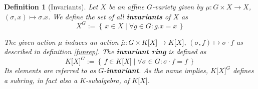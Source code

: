 \message{ !name(roughdraft.tex)}\documentclass[a4paper]{article}
\theoremstyle{prrt}
\newtheorem{definition}[theorem]{Definition}
\begin{document}
\begin{definition}[Invariants]
  Let $X$ be an affine $G$-variety given by $\mu \colon G \times X \rightarrow X$, $(\sigma,x) \mapsto \sigma.x$.
  We define the set of all \textbf{invariants} of $X$ as
  \begin{equation}
    X^G := \left\{\, x \in X \mid \forall g \in G : g . x = x \,\right\}
  \end{equation}
  
  The given action $\mu$ induces an action $ \bar{\mu} \colon G \times K\lbrack X\rbrack \rightarrow K\lbrack X\rbrack $, $(\sigma,f)\mapsto\sigma\cdot f$ as described in definition \ref{funrep}.
  The \textbf{invariant ring} is defined as
  \begin{equation}
    K\lbrack X\rbrack^G := \left\{ \, f \in K\lbrack X \rbrack \mid \forall \sigma \in G : \sigma \cdot f = f \, \right\}
  \end{equation}
  Its elements are referred to as $G$-\textbf{invariant}.
  As the name implies, $ K\lbrack X\rbrack^G $ defines a subring, in fact also a $K$-subalgebra, of $ K\lbrack X\rbrack $.
\end{definition}
\end{document}
